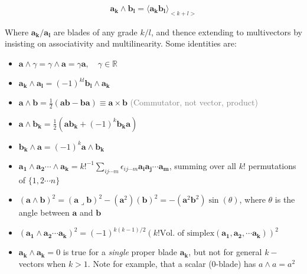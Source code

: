 \documentclass[a4paper]{book}
\numberwithin{equation}{chapter}
\begin{document}
\begin{align}
\mathbf{a_k \wedge b_l} = \langle \mathbf{a_k b_l} \rangle_{<k+l>}
    \label{wedgedef}
\end{align}

Where $\mathbf{a_k/a_l}$ are blades of any grade $k/l$, and thence extending to
multivectors by insisting on associativity and multilinearity.
Some identities are:

\begin{tcolorbox}[colback=white, colframe=blue!10!black, title=\textbf{Outer product identities} ]

\begin{itemize}

    \item $\mathbf{a}\wedge \gamma = \gamma \wedge \mathbf{a} = \gamma \mathbf{a}, \quad \gamma \in \mathbb{R}$
    
    \item $\mathbf{a_k \wedge a_l} = (-1)^{kl}\mathbf{b_l \wedge a_k}$
    
    \item $\mathbf{a\wedge b} = \frac{1}{2}(\mathbf{ab-ba}) \equiv \mathbf{a\times b}$
    \textcolor{gray}{(Commutator, not vector, product)}
    
    \item $\mathbf{a\wedge b_k} = \frac{1}{2}(\mathbf{ab_k} + (-1)^k\mathbf{b_k a} )$
    
    \item $\mathbf{b_k \wedge a} = (-1)^k \mathbf{a\wedge b_k}$
    
    \item $\mathbf{a_1 \wedge a_2 \cdots \wedge a_k} = k!^{-1} \sum_{ij\cdots m}\epsilon_{ij\cdots m} \mathbf{a_i a_j \cdots a_m}$, summing over all $k!$ permutations of $\{1,2\cdots n\}$
    
    \item $(\mathbf{a\wedge b})^2 = (\mathbf{a\lrcorner b})^2 - (\mathbf{a}^2)(\mathbf{b})^2 = -(\mathbf{a}^2\mathbf{b}^2) \sin(\theta)$, where $\theta$ is the angle between $\mathbf{a}$ and $\mathbf{b}$
    
    \item $\mathbf{(a_1 \wedge a_2 \cdots a_k)}^2 = (-1)^{ k(k-1)/2 } (k! \text{Vol. of simplex}(\mathbf{a_1, a_2, \cdots a_k}))^2  $
    
    \item $\mathbf{a_k \wedge a_k} = 0$ is true for a \emph{single} proper blade $\mathbf{a_k}$, but not for general $k-$vectors when $k>1$. Note for example, that a scalar (0-blade) has $a\wedge a= a^2$
\end{itemize}

\end{tcolorbox}
\end{document}

